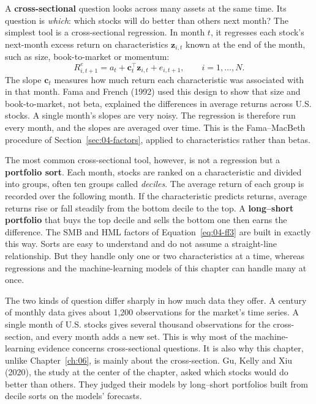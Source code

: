 A \textbf{cross-sectional} question looks across many assets at the same time. Its question is \emph{which}: which stocks will do better than others next month? The simplest tool is a cross-sectional regression. In month $t$, it regresses each stock's next-month excess return on characteristics $\mathbf{z}_{i,t}$ known at the end of the month, such as size, book-to-market or momentum:
\begin{equation}
  R^{e}_{i,t+1} = a_t + \mathbf{c}_t^{\top} \mathbf{z}_{i,t} + e_{i,t+1}, \qquad i = 1, \dots, N.
  \label{eq:20-xs}
\end{equation}
The slope $\mathbf{c}_t$ measures how much return each characteristic was associated with in that month. Fama and French (1992) used this design to show that size and book-to-market, not beta, explained the differences in average returns across U.S. stocks. A single month's slopes are very noisy. The regression is therefore run every month, and the slopes are averaged over time. This is the Fama--MacBeth procedure of Section~\ref{sec:04-factors}, applied to characteristics rather than betas.

The most common cross-sectional tool, however, is not a regression but a \textbf{portfolio sort}. Each month, stocks are ranked on a characteristic and divided into groups, often ten groups called \emph{deciles}. The average return of each group is recorded over the following month. If the characteristic predicts returns, average returns rise or fall steadily from the bottom decile to the top. A \textbf{long--short portfolio} that buys the top decile and sells the bottom one then earns the difference. The SMB and HML factors of Equation~\eqref{eq:04-ff3} are built in exactly this way. Sorts are easy to understand and do not assume a straight-line relationship. But they handle only one or two characteristics at a time, whereas regressions and the machine-learning models of this chapter can handle many at once.

The two kinds of question differ sharply in how much data they offer. A century of monthly data gives about 1,200 observations for the market's time series. A single month of U.S. stocks gives several thousand observations for the cross-section, and every month adds a new set. This is why most of the machine-learning evidence concerns cross-sectional questions. It is also why this chapter, unlike Chapter~\ref{ch:06}, is mainly about the cross-section. Gu, Kelly and Xiu (2020), the study at the center of the chapter, asked which stocks would do better than others. They judged their models by long--short portfolios built from decile sorts on the models' forecasts.

